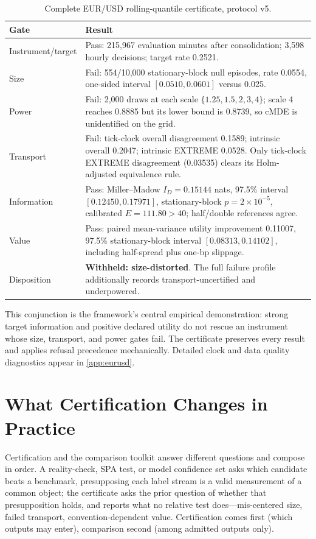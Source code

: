 \documentclass[3p]{elsarticle}
\begin{document}
\begin{table}[htbp]
\centering
\caption{Complete EUR/USD rolling-quantile certificate, protocol v5.}
\label{tab:eurusd-certificate}
\small
\begin{tabularx}{\textwidth}{@{}lX@{}}
\toprule
Gate & Result \\
\midrule
Instrument/target & Pass: 215,967 evaluation minutes after consolidation; 3,598 hourly decisions; target rate 0.2521. \\
Size & Fail: 554/10,000 stationary-block null episodes, rate 0.0554, one-sided interval $[0.0510,0.0601]$ versus 0.025. \\
Power & Fail: 2,000 draws at each scale $\{1.25,1.5,2,3,4\}$; scale 4 reaches 0.8885 but its lower bound is 0.8739, so cMDE is unidentified on the grid. \\
Transport & Fail: tick-clock overall disagreement 0.1589; intrinsic overall 0.2047; intrinsic EXTREME 0.0528. Only tick-clock EXTREME disagreement (0.03535) clears its Holm-adjusted equivalence rule. \\
Information & Pass: Miller--Madow $I_D=0.15144$ nats, 97.5\% interval $[0.12450,0.17971]$, stationary-block $p=2\times10^{-5}$, calibrated $E=111.80>40$; half/double references agree. \\
Value & Pass: paired mean-variance utility improvement 0.11007, 97.5\% stationary-block interval $[0.08313,0.14102]$, including half-spread plus one-bp slippage. \\
Disposition & \textbf{Withheld: size-distorted}. The full failure profile additionally records transport-uncertified and underpowered. \\
\bottomrule
\end{tabularx}
\end{table}

This conjunction is the framework's central empirical demonstration: strong
target information and positive declared utility do not rescue an instrument
whose size, transport, and power gates fail. The certificate preserves every
result and applies refusal precedence mechanically. Detailed clock and data
quality diagnostics appear in \ref{app:eurusd}.

\section{What Certification Changes in Practice}
\label{sec:discussion}

Certification and the comparison toolkit answer different questions and
compose in order. A reality-check, SPA test, or model confidence set
\citep{White2000,Hansen2005,HansenLundeNason2011} asks which candidate beats
a benchmark, presupposing each label stream is a valid measurement of a
common object; the certificate asks the prior question of whether that
presupposition holds, and reports what no relative test does---mis-centered
size, failed transport, convention-dependent value. Certification comes
first (which outputs may enter), comparison second (among admitted outputs
only).
\end{document}

